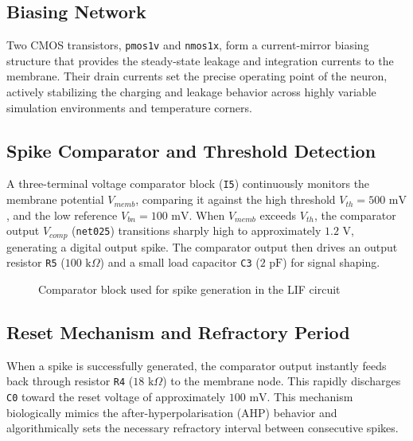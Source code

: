 \subsection{Biasing Network}
Two CMOS transistors, \texttt{pmos1v} and \texttt{nmos1x}, form a current-mirror biasing structure that provides the steady-state leakage and integration currents to the membrane. Their drain currents set the precise operating point of the neuron, actively stabilizing the charging and leakage behavior across highly variable simulation environments and temperature corners.

\subsection{Spike Comparator and Threshold Detection}
A three-terminal voltage comparator block (\texttt{I5}) continuously monitors the membrane potential $V_{memb}$, comparing it against the high threshold $V_{th} = 500\text{ mV}$, and the low reference $V_{bn} = 100\text{ mV}$. When $V_{memb}$ exceeds $V_{th}$, the comparator output $V_{comp}$ (\texttt{net025}) transitions sharply high to approximately $1.2\text{ V}$, generating a digital output spike. The comparator output then drives an output resistor \texttt{R5} ($100\text{ k}\Omega$) and a small load capacitor \texttt{C3} ($2\text{ pF}$) for signal shaping.

\begin{figure}[H]
\centering
\caption{Comparator block used for spike generation in the LIF circuit}
\label{fig:comparator}
\end{figure}

\subsection{Reset Mechanism and Refractory Period}
When a spike is successfully generated, the comparator output instantly feeds back through resistor \texttt{R4} ($18\text{ k}\Omega$) to the membrane node. This rapidly discharges \texttt{C0} toward the reset voltage of approximately $100\text{ mV}$. This mechanism biologically mimics the after-hyperpolarisation (AHP) behavior and algorithmically sets the necessary refractory interval between consecutive spikes.


